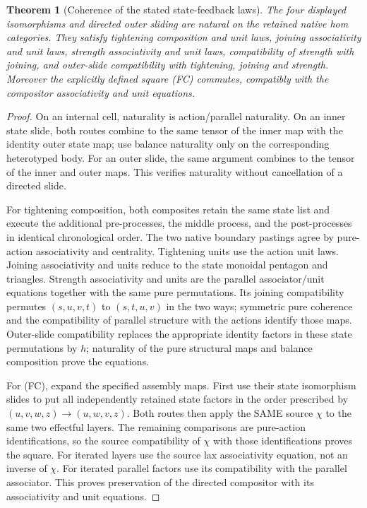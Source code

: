 \documentclass[11pt]{article}
\newtheorem{theorem}{Theorem}
\begin{document}
\begin{theorem}[Coherence of the stated state-feedback laws]
The four displayed isomorphisms and directed outer sliding are natural on the retained native hom categories. They satisfy tightening composition and unit laws, joining associativity and unit laws, strength associativity and unit laws, compatibility of strength with joining, and outer-slide compatibility with tightening, joining and strength. Moreover the explicitly defined square (FC) commutes, compatibly with the compositor associativity and unit equations.
\end{theorem}
\begin{proof}
On an internal cell, naturality is action/parallel naturality. On an inner state slide, both routes combine to the same tensor of the inner map with the identity outer state map; use balance naturality only on the corresponding heterotyped body. For an outer slide, the same argument combines to the tensor of the inner and outer maps. This verifies naturality without cancellation of a directed slide.

For tightening composition, both composites retain the same state list and execute the additional pre-processes, the middle process, and the post-processes in identical chronological order. The two native boundary pastings agree by pure-action associativity and centrality. Tightening units use the action unit laws. Joining associativity and units reduce to the state monoidal pentagon and triangles. Strength associativity and units are the parallel associator/unit equations together with the same pure permutations. Its joining compatibility permutes $(s,u,v,t)$ to $(s,t,u,v)$ in the two ways; symmetric pure coherence and the compatibility of parallel structure with the actions identify those maps. Outer-slide compatibility replaces the appropriate identity factors in these state permutations by $h$; naturality of the pure structural maps and balance composition prove the equations.

For (FC), expand the specified assembly maps. First use their state isomorphism slides to put all independently retained state factors in the order prescribed by $(u,v,w,z)\to(u,w,v,z)$. Both routes then apply the SAME source $\chi$ to the same two effectful layers. The remaining comparisons are pure-action identifications, so the source compatibility of $\chi$ with those identifications proves the square. For iterated layers use the source lax associativity equation, not an inverse of $\chi$. For iterated parallel factors use its compatibility with the parallel associator. This proves preservation of the directed compositor with its associativity and unit equations.
\end{proof}
\end{document}
